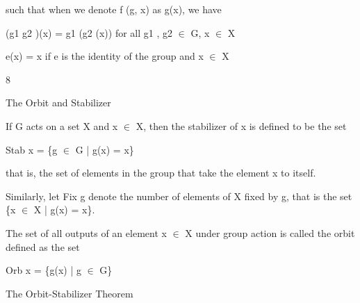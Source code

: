 \documentclass[a4paper,portrait,12pt]{article}
\begin{document}
\begin{flushleft}
such that when we denote f (g, x) as g(x), we have
\end{flushleft}


\begin{flushleft}
(g1 g2 )(x) = g1 (g2 (x)) for all g1 , g2 $\in$ G, x $\in$ X
\end{flushleft}


\begin{flushleft}
e(x) = x if e is the identity of the group and x $\in$ X
\end{flushleft}





8





\begin{flushleft}
\newpage
The Orbit and Stabilizer
\end{flushleft}


\begin{flushleft}
If G acts on a set X and x $\in$ X, then the stabilizer of x is defined to be the set
\end{flushleft}


\begin{flushleft}
Stab x = \{g $\in$ G | g(x) = x\}
\end{flushleft}


\begin{flushleft}
that is, the set of elements in the group that take the element x to itself.
\end{flushleft}


\begin{flushleft}
Similarly, let Fix g denote the number of elements of X fixed by g, that is the set \{x $\in$ X | g(x) = x\}.
\end{flushleft}


\begin{flushleft}
The set of all outputs of an element x $\in$ X under group action is called the orbit defined as the set
\end{flushleft}


\begin{flushleft}
Orb x = \{g(x) | g $\in$ G\}
\end{flushleft}





\begin{flushleft}
The Orbit-Stabilizer Theorem
\end{flushleft}
\end{document}
